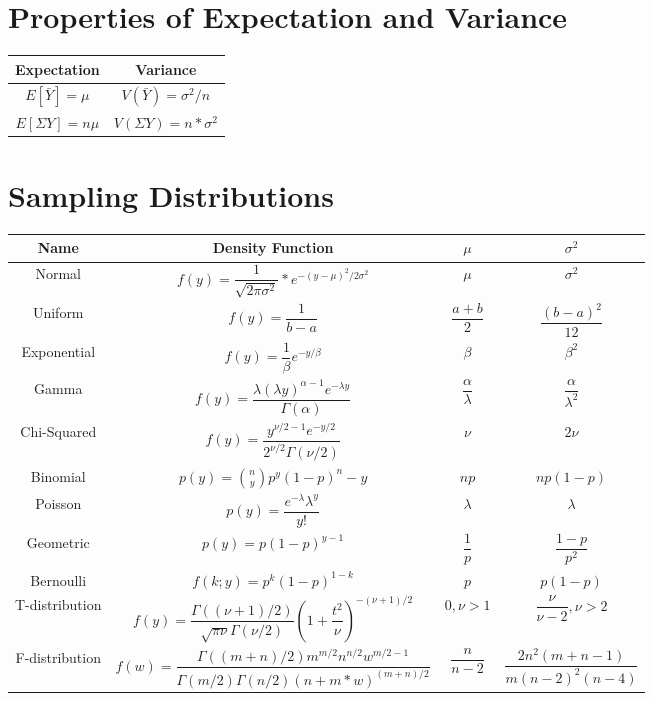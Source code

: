 \documentclass{article}
\begin{document}
\begin{multicols}{2}
\section{Properties of Expectation and Variance}


\begin{tabular} {|c|c|}
\hline
Expectation & Variance \\ \hline
$E[\bar{Y}] =  \mu $ & $V(\bar{Y}) = \sigma^2/n $ \\ \hline
$E[\Sigma Y] = n\mu $ & $V(\Sigma Y) = n*\sigma^2 $ \\ \hline
\end{tabular}

\section{Sampling Distributions}
\begin{tabular}{| c | c | c | c |}
\hline
Name & Density Function & $\mu$  & $\sigma^2$ \\ \hline
Normal & $f(y) = \dfrac{1}{\sqrt{2\pi\sigma^2}}*e^{-(y - \mu)^2 / 2\sigma^2}$ & $\mu$ & $\sigma^2$ \\ \hline
Uniform & $f(y) = \dfrac{1}{b-a}$ & $\dfrac{a+b}{2}$ & $\dfrac{(b-a)^2}{12}$ \\ \hline
Exponential & $f(y) = \dfrac{1}{\beta} e^{-y/\beta}$ & $\beta$ & $\beta^2$ \\ \hline
Gamma & $f(y) = \dfrac{\lambda(\lambda y)^{\alpha-1}e^{-\lambda y}}{\Gamma(\alpha)}$ & $\dfrac{\alpha}{\lambda}$ & $\dfrac{\alpha}{\lambda^2}$ \\ \hline
Chi-Squared & $f(y) = \dfrac{y^{\nu/2-1}e^{-y/2}}{2^{\nu/2}\Gamma(\nu/2)}$ & $\nu$ & $2\nu$ \\ \hline
Binomial & $p(y) = \binom{n}{y} p^y (1-p)^n-y$ & $np$ & $np(1-p)$ \\ \hline
Poisson & $p(y) = \dfrac{e^{-\lambda}\lambda^y}{y!}$ & $\lambda$ & $\lambda$ \\ \hline
Geometric & $p(y) = p(1-p)^{y-1}$ & $\dfrac{1}{p}$ & $\dfrac{1-p}{p^2}$ \\ \hline
Bernoulli & $f(k;y) = p^k(1-p)^{1-k}$ & $p$ & $p(1-p)$ \\ \hline
T-distribution & $f(y) = \dfrac{\Gamma((\nu+1)/2)}{\sqrt{\pi\nu}\Gamma(\nu/2)} (1+\dfrac{t^2}{\nu})^{-(\nu+1)/2}$ & $0, \nu>1$ & $\dfrac{\nu}{\nu-2}, \nu>2$ \\ \hline
F-distribution & $f(w) = \dfrac{\Gamma((m+n)/2)m^{m/2}n^{n/2}w^{m/2-1}}{\Gamma(m/2)\Gamma(n/2)(n+m*w)^{(m+n)/2}}$ & $\dfrac{n}{n-2}$ & $\dfrac{2n^2(m+n-1)}{m(n-2)^2(n-4)}$ \\ \hline

\end{tabular}
\end{multicols}
\end{document}
